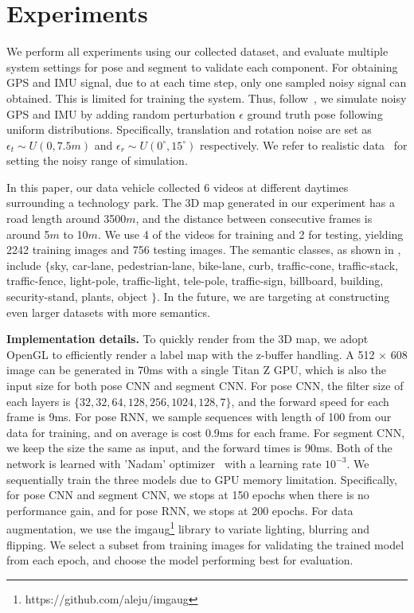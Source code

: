 \vspace{-0.1\baselineskip}
\section{Experiments}
\vspace{-0.1\baselineskip}
\label{sec:experiments}
We perform all experiments using our collected dataset, and evaluate multiple system settings for pose and segment to validate each component.
For obtaining GPS and IMU signal, due to at each time step, only one sampled noisy signal can obtained. This is limited for training the system. Thus, follow~\cite{vishal2015accurate}, we simulate noisy GPS and IMU by adding random perturbation $\epsilon$ \wrt ground truth pose following uniform distributions. 
Specifically, translation and rotation noise are set as $\epsilon_t \sim U(0, 7.5m)$ and $\epsilon_r \sim U(0^{\circ}, 15^{\circ})$ respectively. 
We refer to realistic data~\cite{lee2015gps} for setting the noisy range of simulation.

In this paper, our data vehicle collected 6 videos at different daytimes surrounding a technology park. The 3D map generated in our experiment has a road length around 3500$m$, and the distance between consecutive frames is around 5$m$ to 10$m$. We use 4 of the videos for training and 2 for testing, yielding 2242 training images and 756 testing images. The semantic classes, as shown in , include $\{$sky, car-lane, pedestrian-lane, bike-lane, curb, traffic-cone, traffic-stack, traffic-fence, light-pole, traffic-light, tele-pole, traffic-sign, billboard, building, security-stand, plants, object $\}$. In the future, we are targeting at constructing even larger datasets with more semantics.

\textbf{Implementation details.} To quickly render from the 3D map, we adopt OpenGL to efficiently render a label map with the z-buffer handling. A 512 $\times$ 608 image can be generated in 70ms with a single Titan Z GPU, which is also the input size for both pose CNN and segment CNN. 
For pose CNN, the filter size of each layers is $\{32, 32, 64, 128, 256, 1024, 128, 7\}$, and the forward speed for each frame is 9ms. For pose RNN, we sample sequences with length of 100 from our data for training, and on average is cost 0.9ms for each frame.
For segment CNN, we keep the size the same as input, and the forward times is 90ms. 
Both of the network is learned with 'Nadam' optimizer~\cite{dozat2016incorporating} with a learning rate $10^{-3}$. We sequentially train the three models due to GPU memory limitation.
Specifically, for pose CNN and segment CNN, we stops at 150 epochs when there is no performance gain, and for pose RNN, we stops at 200 epochs. For data augmentation, we use the imgaug\footnote{https://github.com/aleju/imgaug} library to variate lighting, blurring and flipping. We select a subset from training images for validating the trained model from each epoch, and choose the model performing best for evaluation.

